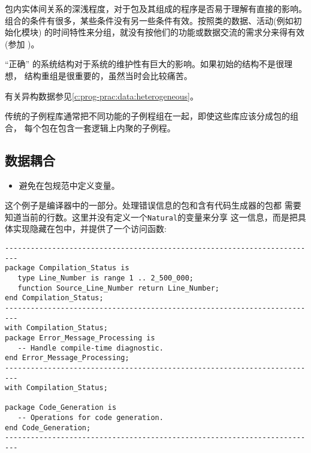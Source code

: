 \begin{blockindent}
包内实体间关系的深浅程度，对于包及其组成的程序是否易于理解有直接的影响。
组合的条件有很多，某些条件没有另一些条件有效。按照类的数据、活动(例如初始化模块)
的时间特性来分组，就没有按他们的功能或数据交流的需求分来得有效
(参加 \cite{charette86})。

``正确'' 的系统结构对于系统的维护性有巨大的影响。如果初始的结构不是很理想，
结构重组是很重要的，虽然当时会比较痛苦。

有关异构数据参见\ref{c:prog-prac:data:heterogeneous}。
\end{blockindent}

\begin{blockindent}
传统的子例程库通常把不同功能的子例程组在一起，即使这些库应该分成包的组合，
每个包在包含一套逻辑上内聚的子例程。
\end{blockindent}

\subsection{数据耦合}
\begin{itemize}
\item 避免在包规范中定义变量。
\end{itemize}


\begin{blockindent}
这个例子是编译器中的一部分。处理错误信息的包和含有代码生成器的包都
需要知道当前的行数。这里并没有定义一个\texttt{Natural}的变量来分享
这一信息，而是把具体实现隐藏在包中，并提供了一个访问函数:

\begin{lstlisting}
-------------------------------------------------------------------------
package Compilation_Status is
   type Line_Number is range 1 .. 2_500_000;
   function Source_Line_Number return Line_Number;
end Compilation_Status;
-------------------------------------------------------------------------
with Compilation_Status;
package Error_Message_Processing is
   -- Handle compile-time diagnostic.
end Error_Message_Processing;
-------------------------------------------------------------------------
with Compilation_Status;

package Code_Generation is
   -- Operations for code generation.
end Code_Generation;
-------------------------------------------------------------------------
\end{lstlisting}
\end{blockindent}

